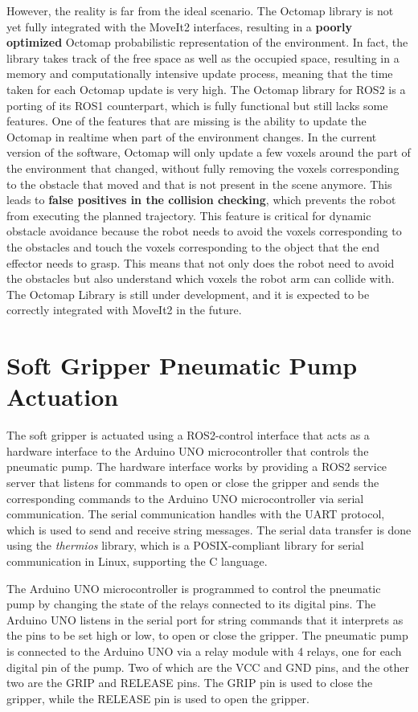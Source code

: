 However, the reality is far from the ideal scenario. The Octomap library is not yet fully integrated with the MoveIt2
interfaces, resulting in a \textbf{poorly optimized} Octomap probabilistic representation of the environment.
In fact, the library takes track of the free space as well as the occupied space, resulting in a memory and computationally
intensive update process, meaning that the time taken for each Octomap update is very high. The Octomap
library for ROS2 is a porting of its ROS1 counterpart, which is fully functional but still lacks some features.
One of the features that are missing is the ability to update the Octomap in realtime when part of the
environment changes. In the current version of the software, Octomap will only update a few voxels around the
part of the environment that changed, without fully removing the voxels corresponding to the obstacle that moved
and that is not present in the scene anymore. This leads to \textbf{false positives in the collision checking}, which
prevents the robot from executing the planned trajectory. This feature is critical for dynamic obstacle avoidance
because the robot needs to avoid the voxels corresponding to the obstacles and touch the voxels corresponding
to the object that the end effector needs to grasp. This means that not only does the robot need to avoid the obstacles
but also understand which voxels the robot arm can collide with.
The Octomap Library is still under development, and it is expected to be correctly integrated with MoveIt2 in the future.

\section{Soft Gripper Pneumatic Pump Actuation}

The soft gripper is actuated using a ROS2-control interface that acts as a hardware interface to the Arduino UNO
microcontroller that controls the pneumatic pump. The hardware interface works by providing a ROS2 service server that 
listens for commands to open or close the gripper and sends the corresponding commands to the Arduino UNO microcontroller
via serial communication. 
The serial communication handles with the UART protocol, which is used to send and receive string messages.
The serial data transfer is done using the \textit{thermios} library, which is a POSIX-compliant library for serial
communication in Linux, supporting the C language.

The Arduino UNO microcontroller is programmed to control the pneumatic pump by changing
the state of the relays connected to its digital pins. The Arduino UNO listens in the serial port for string commands
that it interprets as the pins to be set high or low, to open or close the gripper. The pneumatic pump is connected
to the Arduino UNO via a relay module with 4 relays, one for each digital pin of the pump. Two of which
are the VCC and GND pins, and the other two are the GRIP and RELEASE pins. The GRIP pin is used to close the gripper,
while the RELEASE pin is used to open the gripper.


